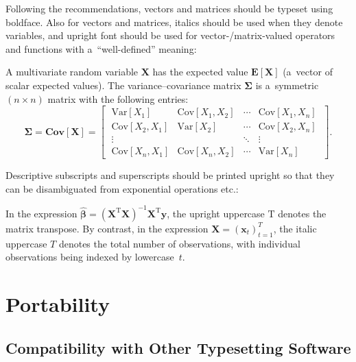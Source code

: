 Following the  recommendations, vectors and matrices should be typeset using boldface. Also for vectors and matrices, italics should be used when they denote variables, and upright font should be used for vector-\slash matrix-valued operators and functions with a~``well-defined'' meaning:
\begin{longtblr}{}
	\begin{minipage}{\linewidth}\noindent%
		A multivariate random variable $\bm{X}$ has the expected value $\mathbf{E}[\boldsymbol{X}]$ (a~vector of scalar expected values). The variance--covariance matrix $\bm{\Sigma}$ is a~symmetric ${(n \times n)}$ matrix with the following entries:
		\vspace{-0.75\smallskipamount}%
		\begin{equation}
			\bm{\Sigma} = \mathbf{Cov}[\bm{X}] =
			\left[\;\begin{matrix}
				\mathrm{Var}[X_1] & \mathrm{Cov}[X_1, X_2] & \cdots & \mathrm{Cov}[X_1, X_n] \\
				\mathrm{Cov}[X_2, X_1] & \mathrm{Var}[X_2] & \cdots & \mathrm{Cov}[X_2, X_n]
				\\
				\vdots & & \ddots & \vdots \\
				\mathrm{Cov}[X_n, X_1] & \mathrm{Cov}[X_n, X_2] & \cdots & \mathrm{Var}[X_n]
			\end{matrix}\;\right].
		\end{equation}
	\end{minipage}\vspace{0.1\smallskipamount}
\end{longtblr}

Descriptive subscripts and superscripts should be printed upright so that they can be disambiguated from exponential operations etc.:
\begin{longtblr}{}
	In the expression ${\hat{\bm{\beta}} = (\bm{X}^\mathrm{T}\bm{X})^{-1}\bm{X}^\mathrm{T}\bm{y}}$, the upright uppercase $\mathrm{T}$ denotes the matrix transpose. By contrast, in the expression ${\bm{X} = (\bm{x}_t)_{t = 1}^T}$, the italic uppercase $T$ denotes the total number of observations, with individual observations being indexed by lowercase~$t$.
\end{longtblr}

\endgroup


\section{Portability}

\subsection{Compatibility with Other Typesetting Software}
\label{sec:portability:compatibility}

